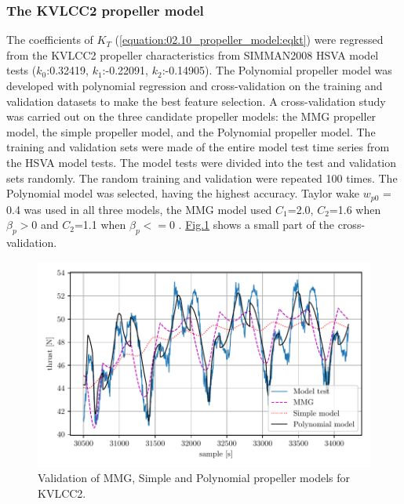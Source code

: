 \subsubsection{The KVLCC2 propeller model}
\label{\detokenize{06.20_results_kvlcc2:the-kvlcc2-propeller-model}}\label{\detokenize{06.20_results_kvlcc2:results-propeller-model}}
\sphinxAtStartPar
The coefficients of \(K_T\) (\autoref{equation:02.10_propeller_model:eqkt}) were regressed from the KVLCC2 propeller characteristics from SIMMAN2008 HSVA model tests \cite{stern_experience_2011} (\(k_0\):{0.32419}, \(k_1\):{-0.22091}, \(k_2\):{-0.14905}).
The Polynomial propeller model was developed with polynomial regression and cross-validation on the training and validation datasets to make the best feature selection.
A cross-validation study was carried out on the three candidate propeller models: the MMG propeller model, the simple propeller model, and the Polynomial propeller model. The training and validation sets were made of the entire model test time series from the HSVA model tests.
The model tests were divided into the test and validation sets randomly. The random training and validation were repeated 100 times. The Polynomial model was selected, having the highest accuracy. Taylor wake \(w_{p0}\) = {0.4} was used in all three models, the MMG model used \(C_1\)={2.0}, \(C_2\)={1.6} when \(\beta_p>0\) and \(C_2\)={1.1} when \(\beta_p<=0\) \cite{yasukawa_introduction_2015-1}. \hyperref[\detokenize{06.20_results_kvlcc2:fig-propeller-validation}]{Fig.\@ \ref{\detokenize{06.20_results_kvlcc2:fig-propeller-validation}}} shows a small part of the cross-validation.

\begin{figure}[!htb]
\centering
\includegraphics{kappa/images/12.pdf}
\caption{Validation of MMG, Simple and Polynomial propeller models for KVLCC2.}\label{\detokenize{06.20_results_kvlcc2:fig-propeller-validation}}\end{figure}

